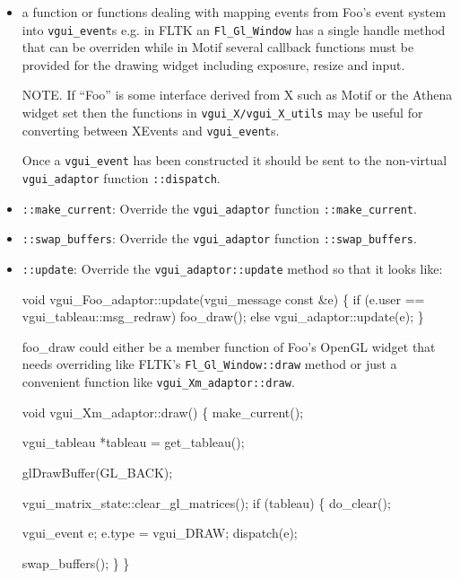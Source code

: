 \documentclass[12pt]{report} \usepackage{epsfig}
\begin{document}
\begin{itemize}
\item  a function or functions dealing with mapping events from Foo's event system into {\tt vgui\_event}s
e.g.  in FLTK an {\tt Fl\_Gl\_Window} has a single handle method that can be overriden
while in Motif several callback functions must be provided for the drawing widget
including  exposure, resize and input.

NOTE.  If ``Foo'' is some interface derived from X  such as Motif or the Athena widget set
then the functions in {\tt vgui\_X/vgui\_X\_utils} may be useful for converting between XEvents and
{\tt vgui\_event}s.

Once a {\tt vgui\_event} has been constructed it should be sent to the non-virtual {\tt vgui\_adaptor}
function {\tt ::dispatch}.

\item {\tt ::make\_current}: Override the {\tt vgui\_adaptor} function {\tt ::make\_current}.

\item {\tt ::swap\_buffers}: Override the {\tt vgui\_adaptor} function {\tt ::swap\_buffers}.

\item {\tt ::update}: Override the {\tt vgui\_adaptor::update} method so that it looks like:

{\scriptsize
\begin{verbawf}
  void vgui\_Foo\_adaptor::update(vgui\_message const &e)
  \{
    if (e.user == vgui\_tableau::msg\_redraw)
      foo\_draw();
    else
      vgui\_adaptor::update(e);
  \}
\end{verbawf}
}

foo\_draw could either be a member function of Foo's OpenGL widget that needs
overriding like  FLTK's {\tt Fl\_Gl\_Window::draw} method or just a convenient function like
{\tt vgui\_Xm\_adaptor::draw}.

{\scriptsize
\begin{verbawf}
  void vgui\_Xm\_adaptor::draw()
  \{
    make\_current();

    vgui\_tableau *tableau = get\_tableau();

    glDrawBuffer(GL\_BACK);

    vgui\_matrix\_state::clear\_gl\_matrices();
    if (tableau)
    \{
      do\_clear();

      vgui\_event e;
      e.type = vgui\_DRAW;
      dispatch(e);

      swap\_buffers();
    \}
  \}
\end{verbawf}
}
\end{itemize}
\end{document}
